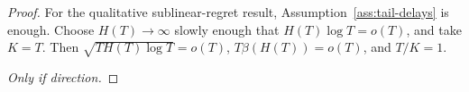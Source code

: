 \documentclass[11pt]{article}
\begin{document}
\begin{proof}
For the qualitative sublinear-regret result, Assumption~\ref{ass:tail-delays}
is enough. Choose \(H(T)\to\infty\) slowly enough that
\(H(T)\log T=o(T)\), and take \(K=T\). Then
\(\sqrt{T H(T)\log T}=o(T)\), \(T\beta(H(T))=o(T)\), and \(T/K=1\).


\medskip
\noindent\emph{Only if direction.}
\end{proof}
\end{document}
